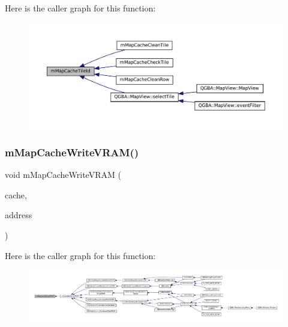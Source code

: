 Here is the caller graph for this function\+:
\nopagebreak
\begin{figure}[H]
\begin{center}
\leavevmode
\includegraphics[width=350pt]{map-cache_8c_a330e8e4a849ed5b322b16c1fbea42b3f_icgraph}
\end{center}
\end{figure}
\mbox{\label{map-cache_8c_af15ad9aac58ad3f592a48581be0f1f29}} 
\subsubsection{\texorpdfstring{m\+Map\+Cache\+Write\+V\+R\+A\+M()}{mMapCacheWriteVRAM()}}
{\footnotesize\ttfamily void m\+Map\+Cache\+Write\+V\+R\+AM (\begin{DoxyParamCaption}\item[{struct m\+Map\+Cache $\ast$}]{cache,  }\item[{uint32\+\_\+t}]{address }\end{DoxyParamCaption})}

Here is the caller graph for this function\+:
\nopagebreak
\begin{figure}[H]
\begin{center}
\leavevmode
\includegraphics[width=350pt]{map-cache_8c_af15ad9aac58ad3f592a48581be0f1f29_icgraph}
\end{center}
\end{figure}
